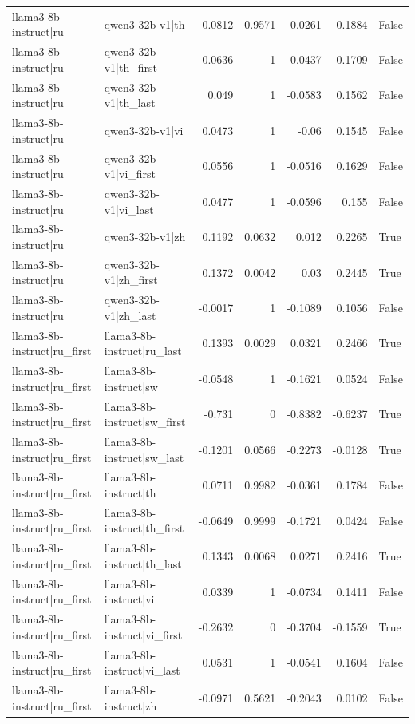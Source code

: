 \begin{table}
\begin{tabular}{l l r r r r l}
llama3-8b-instruct|ru & qwen3-32b-v1|th & 0.0812 & 0.9571 & -0.0261 & 0.1884 & False \\
llama3-8b-instruct|ru & qwen3-32b-v1|th_first & 0.0636 & 1 & -0.0437 & 0.1709 & False \\
llama3-8b-instruct|ru & qwen3-32b-v1|th_last & 0.049 & 1 & -0.0583 & 0.1562 & False \\
llama3-8b-instruct|ru & qwen3-32b-v1|vi & 0.0473 & 1 & -0.06 & 0.1545 & False \\
llama3-8b-instruct|ru & qwen3-32b-v1|vi_first & 0.0556 & 1 & -0.0516 & 0.1629 & False \\
llama3-8b-instruct|ru & qwen3-32b-v1|vi_last & 0.0477 & 1 & -0.0596 & 0.155 & False \\
llama3-8b-instruct|ru & qwen3-32b-v1|zh & 0.1192 & 0.0632 & 0.012 & 0.2265 & True \\
llama3-8b-instruct|ru & qwen3-32b-v1|zh_first & 0.1372 & 0.0042 & 0.03 & 0.2445 & True \\
llama3-8b-instruct|ru & qwen3-32b-v1|zh_last & -0.0017 & 1 & -0.1089 & 0.1056 & False \\
llama3-8b-instruct|ru_first & llama3-8b-instruct|ru_last & 0.1393 & 0.0029 & 0.0321 & 0.2466 & True \\
llama3-8b-instruct|ru_first & llama3-8b-instruct|sw & -0.0548 & 1 & -0.1621 & 0.0524 & False \\
llama3-8b-instruct|ru_first & llama3-8b-instruct|sw_first & -0.731 & 0 & -0.8382 & -0.6237 & True \\
llama3-8b-instruct|ru_first & llama3-8b-instruct|sw_last & -0.1201 & 0.0566 & -0.2273 & -0.0128 & True \\
llama3-8b-instruct|ru_first & llama3-8b-instruct|th & 0.0711 & 0.9982 & -0.0361 & 0.1784 & False \\
llama3-8b-instruct|ru_first & llama3-8b-instruct|th_first & -0.0649 & 0.9999 & -0.1721 & 0.0424 & False \\
llama3-8b-instruct|ru_first & llama3-8b-instruct|th_last & 0.1343 & 0.0068 & 0.0271 & 0.2416 & True \\
llama3-8b-instruct|ru_first & llama3-8b-instruct|vi & 0.0339 & 1 & -0.0734 & 0.1411 & False \\
llama3-8b-instruct|ru_first & llama3-8b-instruct|vi_first & -0.2632 & 0 & -0.3704 & -0.1559 & True \\
llama3-8b-instruct|ru_first & llama3-8b-instruct|vi_last & 0.0531 & 1 & -0.0541 & 0.1604 & False \\
llama3-8b-instruct|ru_first & llama3-8b-instruct|zh & -0.0971 & 0.5621 & -0.2043 & 0.0102 & False \\

\end{tabular}
\end{table}
